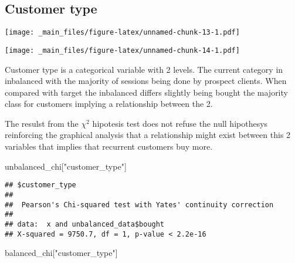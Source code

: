 \documentclass[
]{book}
\newenvironment{Shaded}{\begin{snugshade}}{\end{snugshade}}
\newcommand{\FunctionTok}[1]{\textcolor[rgb]{0.00,0.00,0.00}{#1}}
\newcommand{\NormalTok}[1]{#1}
\newcommand{\SpecialCharTok}[1]{\textcolor[rgb]{0.00,0.00,0.00}{#1}}
\newcommand{\StringTok}[1]{\textcolor[rgb]{0.31,0.60,0.02}{#1}}
\begin{document}
\hypertarget{customer-type}{%
\subsection{Customer type}\label{customer-type}}

\begin{Shaded}
\end{Shaded}

\texttt{[image: \_main\_files/figure-latex/unnamed-chunk-13-1.pdf]}

\begin{Shaded}
\end{Shaded}

\texttt{[image: \_main\_files/figure-latex/unnamed-chunk-14-1.pdf]}

Customer type is a categorical variable with 2 levels. The current category in inbalanced with the majority of sessions being done by prospect clients. When compared with target the inbalanced differs slightly being bought the majority class for customers implying a relationship between the 2.

The resulst from the \(\chi^2\) hipotesis test does not refuse the null hipothesys reinforcing the graphical analysis that a relationship might exist between this 2 variables that implies that recurrent customers buy more.

\begin{Shaded}
\begin{Highlighting}[]
\NormalTok{unbalanced\_chi[}\StringTok{"customer\_type"}\NormalTok{]}
\end{Highlighting}
\end{Shaded}

\begin{verbatim}
## $customer_type
## 
##  Pearson's Chi-squared test with Yates' continuity correction
## 
## data:  x and unbalanced_data$bought
## X-squared = 9750.7, df = 1, p-value < 2.2e-16
\end{verbatim}

\begin{Shaded}
\begin{Highlighting}[]
\NormalTok{balanced\_chi[}\StringTok{"customer\_type"}\NormalTok{]}
\end{Highlighting}
\end{Shaded}
\end{document}
